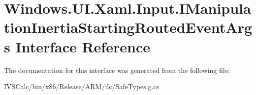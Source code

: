 \hypertarget{interface_windows_1_1_u_i_1_1_xaml_1_1_input_1_1_i_manipulation_inertia_starting_routed_event_args}{}\section{Windows.\+U\+I.\+Xaml.\+Input.\+I\+Manipulation\+Inertia\+Starting\+Routed\+Event\+Args Interface Reference}
\label{interface_windows_1_1_u_i_1_1_xaml_1_1_input_1_1_i_manipulation_inertia_starting_routed_event_args}


The documentation for this interface was generated from the following file\+:\begin{DoxyCompactItemize}
\item 
I\+V\+S\+Calc/bin/x86/\+Release/\+A\+R\+M/ilc/Safe\+Types.\+g.\+cs\end{DoxyCompactItemize}
